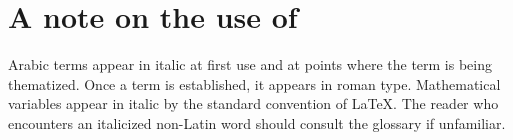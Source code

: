 \section*{A note on the use of }

Arabic terms appear in italic at first use and at points where the
term is being thematized. Once a term is established, it appears in
roman type. Mathematical variables appear in italic by the standard
convention of \LaTeX. The reader who encounters an italicized non-Latin
word should consult the glossary if unfamiliar.

\cleardoublepage
